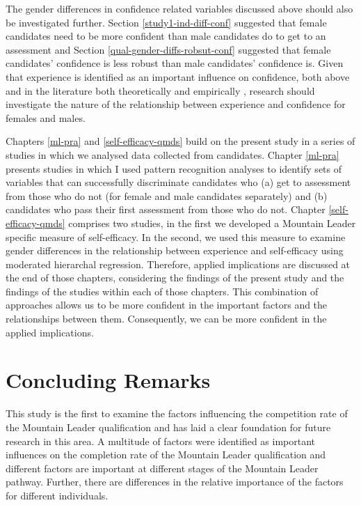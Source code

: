\documentclass[
  12pt,
  a4paper,
]{book}
\begin{document}
The gender differences in confidence related variables discussed above should also be investigated further. Section \ref{study1-ind-diff-conf} suggested that female candidates need to be more confident than male candidates do to get to an assessment and Section \ref{qual-gender-diffs-robsut-conf} suggested that female candidates' confidence is less robust than male candidates' confidence is. Given that experience is identified as an important influence on confidence, both above and in the literature both theoretically \citep[e.g.,][]{Bandura1982} and empirically \citep[e.g.,][]{McAuley2006}, research should investigate the nature of the relationship between experience and confidence for females and males.

Chapters \ref{ml-pra} and \ref{self-efficacy-qmds} build on the present study in a series of studies in which we analysed data collected from candidates. Chapter \ref{ml-pra} presents studies in which I used pattern recognition analyses to identify sets of variables that can successfully discriminate candidates who (a) get to assessment from those who do not (for female and male candidates separately) and (b) candidates who pass their first assessment from those who do not. Chapter \ref{self-efficacy-qmds} comprises two studies, in the first we developed a Mountain Leader specific measure of self-efficacy. In the second, we used this measure to examine gender differences in the relationship between experience and self-efficacy using moderated hierarchal regression. Therefore, applied implications are discussed at the end of those chapters, considering the findings of the present study and the findings of the studies within each of those chapters. This combination of approaches allows us to be more confident in the important factors and the relationships between them. Consequently, we can be more confident in the applied implications.

\hypertarget{qual-concluding-remarks}{%
\section{Concluding Remarks}\label{qual-concluding-remarks}}

This study is the first to examine the factors influencing the competition rate of the Mountain Leader qualification and has laid a clear foundation for future research in this area. A multitude of factors were identified as important influences on the completion rate of the Mountain Leader qualification and different factors are important at different stages of the Mountain Leader pathway. Further, there are differences in the relative importance of the factors for different individuals.
\end{document}
